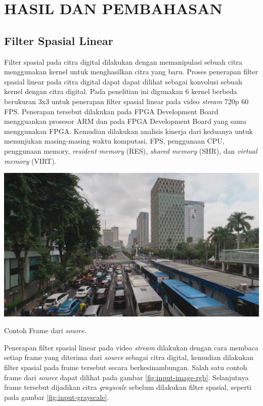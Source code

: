 
\chapter{HASIL DAN PEMBAHASAN}


\section{Filter Spasial Linear}
Filter spasial pada citra digital dilakukan dengan memanipulasi sebuah citra menggunakan kernel untuk menghasilkan citra yang baru. Proses penerapan filter spasial linear pada citra digital dapat dapat dilihat sebagai konvolusi sebuah kernel dengan citra digital. Pada penelitian ini digunakan 6 kernel berbeda berukuran 3x3 untuk penerapan filter spasial linear pada video \textit{stream} 720p 60 FPS. Penerapan tersebut dilakukan pada FPGA Development Board mengguankan prosesor ARM dan pada FPGA Development Board yang sama menggunakan FPGA. Kemudian dilakukan analisis kinerja dari keduanya untuk menunjukan masing-masing waktu komputasi, FPS, penggunaan CPU, penggunaan memory, \textit{resident memory} (RES), \textit{shared memory} (SHR), dan \textit{virtual memory} (VIRT).

\begin{afigure}
    \includegraphics[width=0.8\linewidth, center]{images/input-image/input1.png}
    \caption{Contoh Frame dari \textit{source}.}
    \label{fig:input-image-rgb}
\end{afigure}

Penerapan filter spasial linear pada video \textit{stream} dilakukan dengan cara membaca setiap frame yang diterima dari \textit{source} sebagai citra digital, kemudian dilakukan filter spasial pada frame tersebut secara berkesinambungan. 
Salah satu contoh frame dari \textit{source} dapat dilihat pada gambar \ref{fig:input-image-rgb}. Selanjutnya frame tersebut dijadikan citra \textit{grayscale} sebelum dilakukan filter spasial, seperti pada gambar \ref{fig:input-grayscale}.

